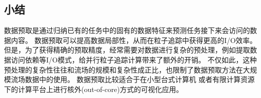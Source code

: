 \subsection{小结}
数据预取是通过归纳已有的任务中的固有的数据特征来预测任务接下来会访问的数据内容。
数据预取可以提高数据局部性，从而在粒子追踪中获得更高的I/O效率。
但是，为了获得精确的预取精度，经常需要对数据进行复杂的预处理，例如提取数据访问依赖等I/O模式，给并行粒子追踪计算带来了额外的开销。
不仅如此，这种预处理的复杂性往往和流场的规模和复杂性成正比，也限制了数据预取方法在大规模流场数据中的使用。
数据预取比较适合于在小型台式计算机\parencite{VermaKP00, ChenNLS12, ChenS13} 或者有限计算资源下的计算平台\parencite{GuoZLLYHMP14}上进行核外(out-of-core)方式的可视化应用。

